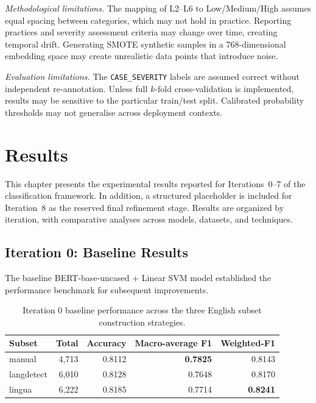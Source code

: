 \documentclass[11pt, titlepage, bibliography=totoc]{scrreprt}
\begin{document}
\textit{Methodological limitations.} The mapping of L2--L6 to Low/Medium/High assumes equal spacing between categories, which may not hold in practice. Reporting practices and severity assessment criteria may change over time, creating temporal drift. Generating SMOTE synthetic samples in a 768-dimensional embedding space may create unrealistic data points that introduce noise.

\textit{Evaluation limitations.} The \texttt{CASE\_SEVERITY} labels are assumed correct without independent re-annotation. Unless full $k$-fold cross-validation is implemented, results may be sensitive to the particular train/test split. Calibrated probability thresholds may not generalise across deployment contexts.

\chapter{Results}

This chapter presents the experimental results reported for Iterations~0--7 of the classification framework. In addition, a structured placeholder is included for Iteration~8 as the reserved final refinement stage. Results are organized by iteration, with comparative analyses across models, datasets, and techniques.

\section{Iteration 0: Baseline Results}

The baseline BERT-base-uncased + Linear SVM model established the performance benchmark for subsequent improvements.

\begin{table}[htbp]
\centering
\caption{Iteration 0 baseline performance across the three English subset construction strategies.}
\label{tab:results-iter0}
\begin{tabular}{lrrrr}
\toprule
\textbf{Subset} & \textbf{Total} & \textbf{Accuracy} & \textbf{Macro-average F1} & \textbf{Weighted-F1} \\
\midrule
manual     & 4,713 & 0.8112 & \textbf{0.7825} & 0.8143 \\
langdetect & 6,010 & 0.8128 & 0.7648 & 0.8170 \\
lingua     & 6,222 & 0.8185 & 0.7714 & \textbf{0.8241} \\
\bottomrule
\end{tabular}
\end{table}
\end{document}
